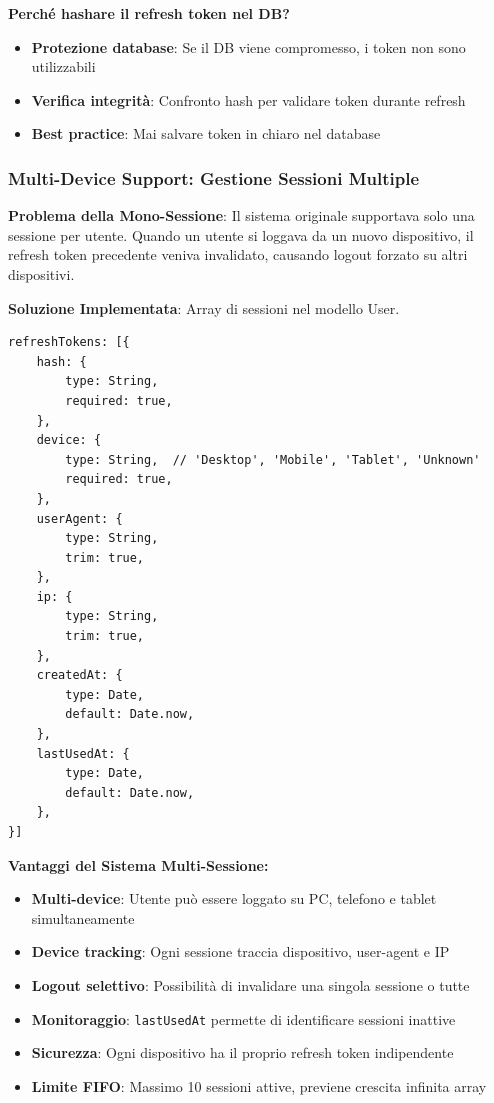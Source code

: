 \documentclass[11pt,a4paper]{article}
\newcommand{\code}[1]{\texttt{#1}}
\newcommand{\important}[1]{\textcolor{red!80!black}{\textbf{#1}}}
\begin{document}
\textbf{Perché hashare il refresh token nel DB?}
\begin{itemize}
    \item \textbf{Protezione database}: Se il DB viene compromesso, i token non sono utilizzabili
    \item \textbf{Verifica integrità}: Confronto hash per validare token durante refresh
    \item \textbf{Best practice}: Mai salvare token in chiaro nel database
\end{itemize}

\subsubsection{Multi-Device Support: Gestione Sessioni Multiple}

\important{Problema della Mono-Sessione}: Il sistema originale supportava solo una sessione per utente. Quando un utente si loggava da un nuovo dispositivo, il refresh token precedente veniva invalidato, causando logout forzato su altri dispositivi.

\textbf{Soluzione Implementata}: Array di sessioni nel modello User.

\begin{lstlisting}[caption=Schema RefreshTokens Array nel Modello User]
refreshTokens: [{
    hash: {
        type: String,
        required: true,
    },
    device: {
        type: String,  // 'Desktop', 'Mobile', 'Tablet', 'Unknown'
        required: true,
    },
    userAgent: {
        type: String,
        trim: true,
    },
    ip: {
        type: String,
        trim: true,
    },
    createdAt: {
        type: Date,
        default: Date.now,
    },
    lastUsedAt: {
        type: Date,
        default: Date.now,
    },
}]
\end{lstlisting}

\textbf{Vantaggi del Sistema Multi-Sessione:}
\begin{itemize}
    \item \textbf{Multi-device}: Utente può essere loggato su PC, telefono e tablet simultaneamente
    \item \textbf{Device tracking}: Ogni sessione traccia dispositivo, user-agent e IP
    \item \textbf{Logout selettivo}: Possibilità di invalidare una singola sessione o tutte
    \item \textbf{Monitoraggio}: \code{lastUsedAt} permette di identificare sessioni inattive
    \item \textbf{Sicurezza}: Ogni dispositivo ha il proprio refresh token indipendente
    \item \textbf{Limite FIFO}: Massimo 10 sessioni attive, previene crescita infinita array
\end{itemize}
\end{document}
